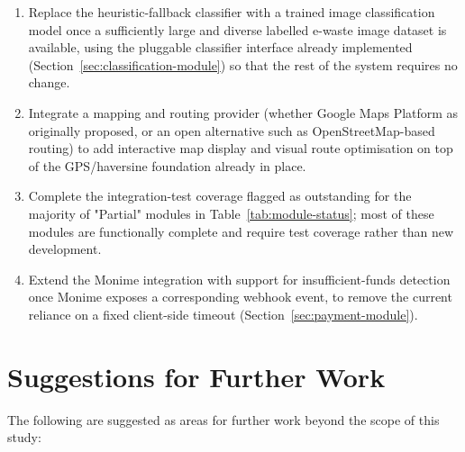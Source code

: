 \begin{enumerate}[leftmargin=1.4cm]
  \item Replace the heuristic-fallback classifier with a trained image
    classification model once a sufficiently large and diverse labelled
    e-waste image dataset is available, using the pluggable classifier
    interface already implemented (Section~\ref{sec:classification-module})
    so that the rest of the system requires no change.
  \item Integrate a mapping and routing provider (whether Google Maps
    Platform as originally proposed, or an open alternative such as
    OpenStreetMap-based routing) to add interactive map display and visual
    route optimisation on top of the GPS/haversine foundation already in
    place.
  \item Complete the integration-test coverage flagged as outstanding for
    the majority of "Partial" modules in Table~\ref{tab:module-status};
    most of these modules are functionally complete and require test
    coverage rather than new development.
  \item Extend the Monime integration with support for insufficient-funds
    detection once Monime exposes a corresponding webhook event, to remove
    the current reliance on a fixed client-side timeout
    (Section~\ref{sec:payment-module}).
\end{enumerate}

\section{Suggestions for Further Work}
\label{sec:future-work}

The following are suggested as areas for further work beyond the scope of
this study:

